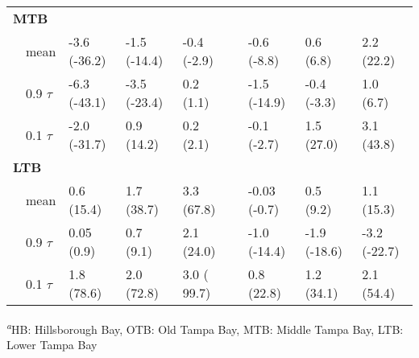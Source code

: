 \documentclass{svjour3}\usepackage[]{graphicx}\usepackage[]{color}
\begin{document}
\begin{table}[!tbp]
\begin{center}
\begin{tabular}{llllclll}
\hline
{\bfseries MTB}&&&&&&&\tabularnewline
~~mean&-3.6 {\footnotesize (-36.2)}&-1.5 {\footnotesize (-14.4)}&-0.4 {\footnotesize (-2.9)}&&-0.6 {\footnotesize (-8.8)}&0.6 {\footnotesize (6.8)}&2.2 {\footnotesize (22.2)}\tabularnewline
~~0.9 $\tau$&-6.3 {\footnotesize (-43.1)}&-3.5 {\footnotesize (-23.4)}&0.2 {\footnotesize (1.1)}&&-1.5 {\footnotesize (-14.9)}&-0.4 {\footnotesize (-3.3)}&1.0 {\footnotesize (6.7)}\tabularnewline
~~0.1 $\tau$&-2.0 {\footnotesize (-31.7)}&0.9 {\footnotesize (14.2)}&0.2 {\footnotesize (2.1)}&&-0.1 {\footnotesize (-2.7)}&1.5 {\footnotesize (27.0)}&3.1 {\footnotesize (43.8)}\tabularnewline
\hline
{\bfseries LTB}&&&&&&&\tabularnewline
~~mean&0.6 {\footnotesize (15.4)}&1.7 {\footnotesize (38.7)}&3.3 {\footnotesize (67.8)}&&-0.03 {\footnotesize (-0.7)}&0.5 {\footnotesize (9.2)}&1.1 {\footnotesize (15.3)}\tabularnewline
~~0.9 $\tau$&0.05 {\footnotesize (0.9)}&0.7 {\footnotesize (9.1)}&2.1 {\footnotesize (24.0)}&&-1.0 {\footnotesize (-14.4)}&-1.9 {\footnotesize (-18.6)}&-3.2 {\footnotesize (-22.7)}\tabularnewline
~~0.1 $\tau$&1.8 {\footnotesize (78.6)}&2.0 {\footnotesize (72.8)}&3.0 {\footnotesize ( 99.7)}&&0.8 {\footnotesize (22.8)}&1.2 {\footnotesize (34.1)}&2.1 {\footnotesize (54.4)}\tabularnewline
\hline
\end{tabular}
\end{center}
\footnotesize \textsuperscript{\textit{a}}HB: Hillsborough Bay, OTB: Old Tampa Bay, MTB: Middle Tampa Bay, LTB: Lower Tampa Bay\end{table}
\end{document}
